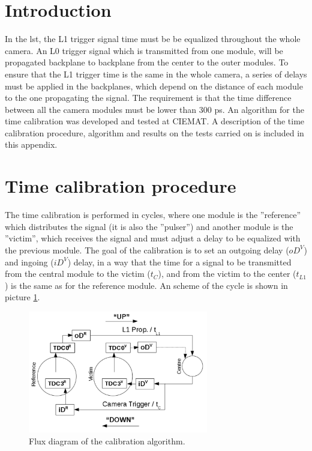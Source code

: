 \documentclass[main.tex]{subfiles}
\begin{document}
\glsresetall

\section{Introduction}

In the \gls{lst}, the L1 trigger signal time must be be equalized throughout the whole camera. An L0 trigger signal which is transmitted from one module, will be propagated backplane to backplane from the center to the outer modules. To ensure that the L1 trigger time is the same in the whole camera, a series of delays must be applied in the backplanes, which depend on the distance of each module to the one propagating the signal. The requirement is that the time difference between all the camera modules must be lower than 300 ps. An algorithm for the time calibration was developed and tested at CIEMAT. A description of the time calibration procedure, algorithm and results on the tests carried on is included in this appendix.

\section{Time calibration procedure}

The time calibration is performed in cycles, where one module is the ''reference'' which distributes the signal (it is also the ''pulser'') and another module is the ''victim'', which receives the signal and must adjust a delay to be equalized with the previous module. The goal of the calibration is to set an outgoing delay ($oD^{V}$) and ingoing ($iD^{V}$) delay, in a way that the time for a signal to be transmitted from the central module to the victim ($t_{C}$), and from the victim to the center ($t_{L1}$) is the same as for the reference module. An scheme of the cycle is shown in picture \ref{fig:calibcicle}. 

\begin{figure}
  \centering
  \includegraphics[width=0.7\textwidth]{./Pictures/timecalib.pdf}
  \caption{Flux diagram of the calibration algorithm.}
  \label{fig:calibcicle}
\end{figure}
\end{document}

